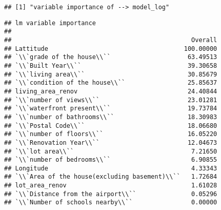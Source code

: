 \documentclass[
]{article}
\begin{document}
\begin{verbatim}
## [1] "variable importance of --> model_log"
\end{verbatim}

\begin{verbatim}
## lm variable importance
## 
##                                                 Overall
## Lattitude                                     100.00000
## `\\`grade of the house\\``                     63.49513
## `\\`Built Year\\``                             39.30658
## `\\`living area\\``                            30.85679
## `\\`condition of the house\\``                 25.85637
## living_area_renov                              24.40844
## `\\`number of views\\``                        23.01281
## `\\`waterfront present\\``                     19.73784
## `\\`number of bathrooms\\``                    18.30983
## `\\`Postal Code\\``                            18.06680
## `\\`number of floors\\``                       16.05220
## `\\`Renovation Year\\``                        12.04673
## `\\`lot area\\``                                7.21650
## `\\`number of bedrooms\\``                      6.90855
## Longitude                                       4.33343
## `\\`Area of the house(excluding basement)\\``   1.72684
## lot_area_renov                                  1.61028
## `\\`Distance from the airport\\``               0.05296
## `\\`Number of schools nearby\\``                0.00000
\end{verbatim}
\end{document}
